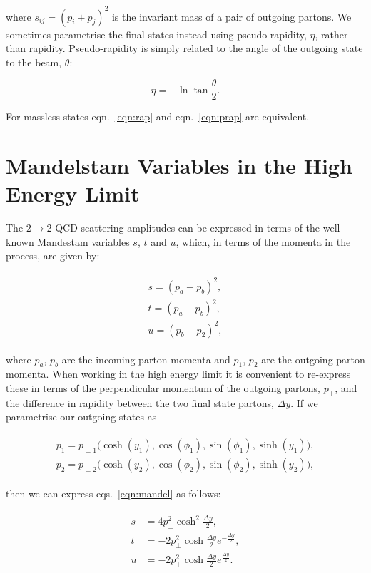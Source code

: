 	where $s_{ij} = (p_i + p_j)^2$ is the invariant mass of a pair of outgoing partons.  We sometimes
	parametrise the final states instead using pseudo-rapidity, $\eta$, rather than rapidity. Pseudo-rapidity
	is simply related to the angle of the outgoing state to the beam, $\theta$:

	\begin{equation}
		\eta = -\ln\tan\frac{\theta}{2}.
		\label{eqn:prap}
	\end{equation}

	For massless states eqn.~\eqref{eqn:rap} and eqn.~\eqref{eqn:prap} are equivalent.

\section{Mandelstam Variables in the High Energy Limit}
	\label{sub:MandelstamVariables}

	The $2\rightarrow 2$ QCD scattering amplitudes can be expressed in terms of the well-known Mandestam
	variables $s$, $t$ and $u$, which, in terms of the momenta in the process, are given by:

	\begin{align}
	\begin{split}
		s = (p_a + p_b)^2, \\
		t = (p_a - p_b)^2, \\
		u = (p_b - p_2)^2,
		\label{eqn:mandel}
	\end{split}
	\end{align}

	where $p_a$, $p_b$ are the incoming parton momenta and $p_1$, $p_2$ are the outgoing parton momenta.
	When working in the high energy limit it is convenient to re-express these in terms of the
	perpendicular momentum of the outgoing partons, $p_\perp$, and the difference in rapidity
	between the two final state partons, $\Delta y$.  If we parametrise our outgoing states as

	\begin{align}
	\begin{split}
		p_1 = p_{\perp1}\big(\cosh (y_1), \cos(\phi_1), \sin(\phi_1), \sinh (y_1)\big),\\
		p_2 = p_{\perp2}\big(\cosh (y_2), \cos(\phi_2), \sin(\phi_2), \sinh (y_2)\big),
	\end{split}
	\end{align}

	then we can express eqs.~\eqref{eqn:mandel} as follows:

	\begin{align}
	\begin{split}
		s &=  4p_\perp^2 \cosh^2\frac{\Delta y}{2}, \\
		t &= -2p_\perp^2 \cosh  \frac{\Delta y}{2}e^{-\frac{\Delta y}{2}}, \\
		u &= -2p_\perp^2 \cosh  \frac{\Delta y}{2}e^{ \frac{\Delta y}{2}}.
	\end{split}
	\end{align}

